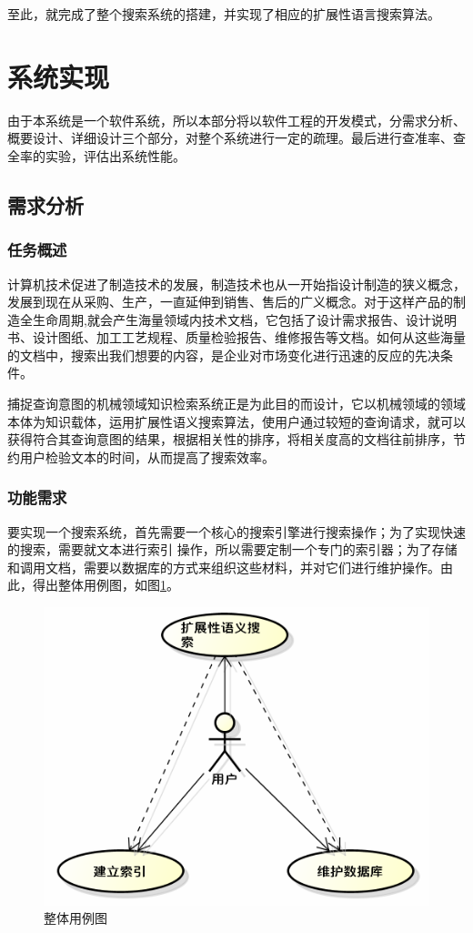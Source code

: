 \documentclass[12pt,a4paper]{article}
\begin{document}
	至此，就完成了整个搜索系统的搭建，并实现了相应的扩展性语言搜索算法。
	
\newpage
\section{系统实现}
\setcounter{figure}{0}
\setcounter{table}{0}
\setcounter{equation}{0}
	由于本系统是一个软件系统，所以本部分将以软件工程的开发模式，分需求分析、概要设计、详细设计三个部分，对整个系统进行一定的疏理。最后进行查准率、查全率的实验，评估出系统性能。
	\subsection{需求分析}
		\subsubsection{任务概述}
	计算机技术促进了制造技术的发展，制造技术也从一开始指设计制造的狭义概念，发展到现在从采购、生产，一直延伸到销售、售后的广义概念。对于这样产品的制造全生命周期,就会产生海量领域内技术文档，它包括了设计需求报告、设计说明书、设计图纸、加工工艺规程、质量检验报告、维修报告等文档。如何从这些海量的文档中，搜索出我们想要的内容，是企业对市场变化进行迅速的反应的先决条件。
	
	捕捉查询意图的机械领域知识检索系统正是为此目的而设计，它以机械领域的领域本体为知识载体，运用扩展性语义搜索算法，使用户通过较短的查询请求，就可以获得符合其查询意图的结果，根据相关性的排序，将相关度高的文档往前排序，节约用户检验文本的时间，从而提高了搜索效率。
   
		\subsubsection{功能需求}
	要实现一个搜索系统，首先需要一个核心的搜索引擎进行搜索操作；为了实现快速的搜索，需要就文本进行索引	操作，所以需要定制一个专门的索引器；为了存储和调用文档，需要以数据库的方式来组织这些材料，并对它们进行维护操作。由此，得出整体用例图，如图\ref{fig:整体用例图}。
	
	\begin{figure}[htbp] 
	\centering\includegraphics[scale=0.5]{fig/SystemUseCase.png} 
	\caption{整体用例图}\label{fig:整体用例图} 
	\end{figure} 
	
\end{document}

